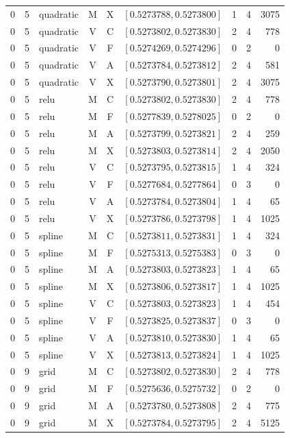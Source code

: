 \begin{longtable}{r r l c c l r r r}
0 & 5 & quadratic & M & X & $[0.5273788,0.5273800]$ & 1 & 4 & 3075 \\
0 & 5 & quadratic & V & C & $[0.5273802,0.5273830]$ & 2 & 4 & 778 \\
0 & 5 & quadratic & V & F & $[0.5274269,0.5274296]$ & 0 & 2 & 0 \\
0 & 5 & quadratic & V & A & $[0.5273784,0.5273812]$ & 2 & 4 & 581 \\
0 & 5 & quadratic & V & X & $[0.5273790,0.5273801]$ & 2 & 4 & 3075 \\
0 & 5 & relu & M & C & $[0.5273802,0.5273830]$ & 2 & 4 & 778 \\
0 & 5 & relu & M & F & $[0.5277839,0.5278025]$ & 0 & 2 & 0 \\
0 & 5 & relu & M & A & $[0.5273799,0.5273821]$ & 2 & 4 & 259 \\
0 & 5 & relu & M & X & $[0.5273803,0.5273814]$ & 2 & 4 & 2050 \\
0 & 5 & relu & V & C & $[0.5273795,0.5273815]$ & 1 & 4 & 324 \\
0 & 5 & relu & V & F & $[0.5277684,0.5277864]$ & 0 & 3 & 0 \\
0 & 5 & relu & V & A & $[0.5273784,0.5273804]$ & 1 & 4 & 65 \\
0 & 5 & relu & V & X & $[0.5273786,0.5273798]$ & 1 & 4 & 1025 \\
0 & 5 & spline & M & C & $[0.5273811,0.5273831]$ & 1 & 4 & 324 \\
0 & 5 & spline & M & F & $[0.5275313,0.5275383]$ & 0 & 3 & 0 \\
0 & 5 & spline & M & A & $[0.5273803,0.5273823]$ & 1 & 4 & 65 \\
0 & 5 & spline & M & X & $[0.5273806,0.5273817]$ & 1 & 4 & 1025 \\
0 & 5 & spline & V & C & $[0.5273803,0.5273823]$ & 1 & 4 & 454 \\
0 & 5 & spline & V & F & $[0.5273825,0.5273837]$ & 0 & 3 & 0 \\
0 & 5 & spline & V & A & $[0.5273810,0.5273830]$ & 1 & 4 & 65 \\
0 & 5 & spline & V & X & $[0.5273813,0.5273824]$ & 1 & 4 & 1025 \\
0 & 9 & grid & M & C & $[0.5273802,0.5273830]$ & 2 & 4 & 778 \\
0 & 9 & grid & M & F & $[0.5275636,0.5275732]$ & 0 & 2 & 0 \\
0 & 9 & grid & M & A & $[0.5273780,0.5273808]$ & 2 & 4 & 775 \\
0 & 9 & grid & M & X & $[0.5273784,0.5273795]$ & 2 & 4 & 5125 \\

\end{longtable}
